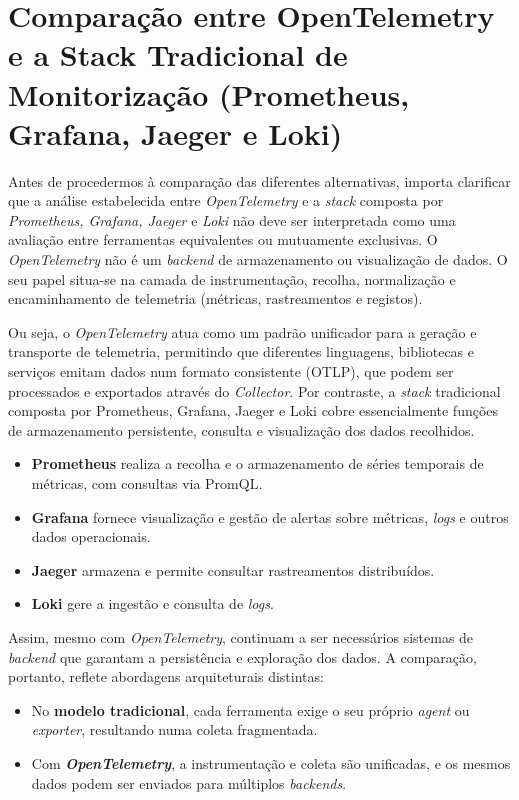 \break


\section{Comparação entre OpenTelemetry e a Stack Tradicional de Monitorização (Prometheus, Grafana, Jaeger e Loki)}


Antes de procedermos à comparação das diferentes alternativas, importa clarificar que a análise estabelecida entre \textit{OpenTelemetry} e a \textit{stack} composta por \textit{ Prometheus, Grafana, Jaeger} e \textit{ Loki} não deve ser interpretada como uma avaliação entre ferramentas equivalentes ou mutuamente exclusivas. O \textit{OpenTelemetry} não é um \textit{backend} de armazenamento ou visualização de dados. O seu papel situa-se na camada de instrumentação, recolha, normalização e encaminhamento de telemetria (métricas, rastreamentos e registos).

Ou seja, o \textit{OpenTelemetry} atua como um padrão unificador para a geração e transporte de telemetria, permitindo que diferentes linguagens, bibliotecas e serviços emitam dados num formato consistente (OTLP), que podem ser processados e exportados através do \textit{Collector}. Por contraste, a \textit{stack} tradicional composta por Prometheus, Grafana, Jaeger e Loki cobre essencialmente funções de armazenamento persistente, consulta e visualização dos dados recolhidos.

\begin{itemize}
\item \textbf{Prometheus} realiza a recolha e o armazenamento de séries temporais de métricas, com consultas via PromQL.
\item \textbf{Grafana} fornece visualização e gestão de alertas sobre métricas, \textit{logs} e outros dados operacionais.
\item \textbf{Jaeger} armazena e permite consultar rastreamentos distribuídos.
\item \textbf{Loki} gere a ingestão e consulta de \textit{logs}.
\end{itemize}

Assim, mesmo com \textit{OpenTelemetry}, continuam a ser necessários sistemas de \textit{backend} que garantam a persistência e exploração dos dados. A comparação, portanto, reflete abordagens arquiteturais distintas:

\begin{itemize}
\item No \textbf{modelo tradicional}, cada ferramenta exige o seu próprio \textit{agent} ou \textit{exporter}, resultando numa coleta fragmentada.
\item Com \textbf{\textit{OpenTelemetry}}, a instrumentação e coleta são unificadas, e os mesmos dados podem ser enviados para múltiplos \textit{backends}.
\end{itemize}

